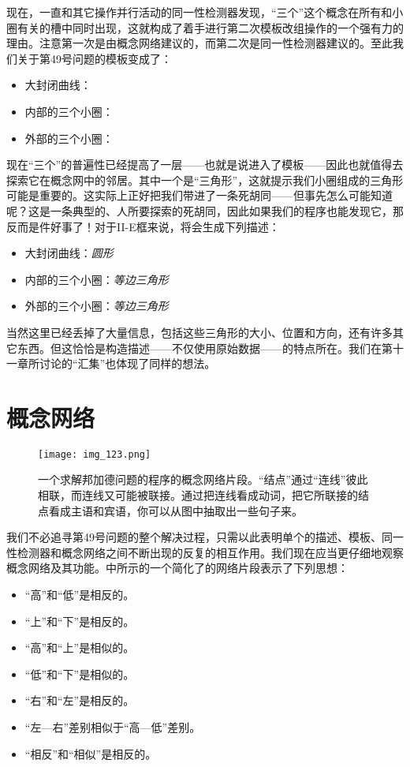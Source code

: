 现在，一直和其它操作并行活动的同一性检测器发现，“三个”这个概念在所有和小圈有关的槽中同时出现，这就构成了着手进行第二次模板改组操作的一个强有力的理由。注意第一次是由概念网络建议的，而第二次是同一性检测器建议的。至此我们关于第49号问题的模板变成了：
\begin{itemize}
\item 大封闭曲线：\blankline
\item 内部的三个小圈：\blankline
\item 外部的三个小圈：\blankline
\end{itemize}

现在“三个”的普遍性已经提高了一层——也就是说进入了模板——因此也就值得去探索它在概念网中的邻居。其中一个是“三角形”，这就提示我们小圈组成的三角形可能是重要的。这实际上正好把我们带进了一条死胡同——但事先怎么可能知道呢？这是一条典型的、人所要探索的死胡同，因此如果我们的程序也能发现它，那反而是件好事了！对于II-E框来说，将会生成下列描述：
\begin{itemize}
\item 大封闭曲线：\textit{圆形}
\item 内部的三个小圈：\textit{等边三角形}
\item 外部的三个小圈：\textit{等边三角形}
\end{itemize}

当然这里已经丢掉了大量信息，包括这些三角形的大小、位置和方向，还有许多其它东西。但这恰恰是构造描述——不仅使用原始数据——的特点所在。我们在第十一章所讨论的“汇集”也体现了同样的想法。

\section{概念网络}

\begin{figure}
\texttt{[image: img\_123.png]}
\caption[一个求解邦加德问题的程序的概念网络片段。]
  {一个求解邦加德问题的程序的概念网络片段。“结点”通过“连线”彼此相联，而连线又可能被联接。通过把连线看成动词，把它所联接的结点看成主语和宾语，你可以从图中抽取出一些句子来。}
\end{figure}

我们不必追寻第49号问题的整个解决过程，只需以此表明单个的描述、模板、同一性检测器和概念网络之间不断出现的反复的相互作用。我们现在应当更仔细地观察概念网络及其功能。中所示的一个简化了的网络片段表示了下列思想：
\begin{itemize}
\item “高”和“低”是相反的。
\item “上”和“下”是相反的。
\item “高”和“上”是相似的。
\item “低”和“下”是相似的。
\item “右”和“左”是相反的。
\item “左—右”差别相似于“高—低”差别。
\item “相反”和“相似”是相反的。
\end{itemize}

